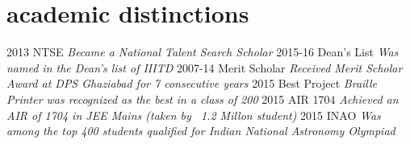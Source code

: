 \documentclass[]{friggeri-cv}
\begin{document}
\section{academic distinctions}

\begin{entrylist}
  \entry
    {2013}
    {NTSE}
    {}
    {\emph{Became a National Talent Search Scholar}}
  \entry
    {2015-16}
    {Dean's List}
    {}
    {\emph{Was named in the Dean's list of IIITD}}
  \entry
    {2007-14}
    {Merit Scholar}
    {}
    {\emph{Received Merit Scholar Award at DPS Ghaziabad for 7 consecutive years}}
  \entry
    {2015}
    {Best Project}
    {}
    {\emph{Braille Printer was recognized as the best in a class of 200}}
  \entry
    {2015}
    {AIR 1704}
    {}
    {\emph{Achieved an AIR of 1704 in JEE Mains (taken by ~1.2 Millon student)}}
  \entry
    {2015}
    {INAO}
    {}
    {\emph{Was among the top 400 students qualified for Indian National Astronomy Olympiad}}
\end{entrylist}
\end{document}
